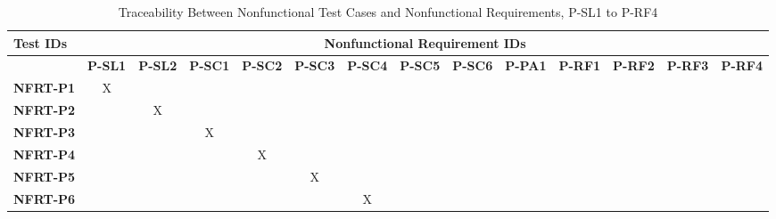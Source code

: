 \documentclass[12pt, titlepage]{article}
\begin{document}
\begin{landscape}
		\begin{longtable}{|l|ccccccccccccc|}
	\caption{Traceability Between Nonfunctional Test Cases and Nonfunctional Requirements, P-SL1 to P-RF4}                                                                                                                                                                                                                           \\
		\hline
		\textbf{Test IDs}   & \multicolumn{13}{c|}{\textbf{Nonfunctional Requirement IDs}}                                                                                                                                                                                                                 \\
		\hline
		~                   & \textbf{P-SL1}  & \textbf{P-SL2} & \textbf{P-SC1} & \textbf{P-SC2} & \textbf{P-SC3} & \textbf{P-SC4} & \textbf{P-SC5} & \textbf{P-SC6} & \textbf{P-PA1} & \textbf{P-RF1} & \textbf{P-RF2} & \textbf{P-RF3} & \textbf{P-RF4} \\
		\hline
		\textbf{NFRT-P1} & X                                                         & ~             & ~             & ~             & ~             & ~             & ~             & ~             & ~             & ~             & ~             & ~             & ~\\
		\textbf{NFRT-P2} & ~                                                         & X             & ~             & ~             & ~             & ~             & ~             & ~             & ~             & ~             & ~             & ~             & ~ \\
		\textbf{NFRT-P3} & ~                                                         & ~             & X             & ~             & ~             & ~             & ~             & ~             & ~             & ~             & ~ & ~ & ~ \\
		\textbf{NFRT-P4} & ~                                                         & ~             & ~             & X             & ~             & ~             & ~             & ~             & ~             & ~             & ~ & ~ & ~ \\
		\textbf{NFRT-P5} & ~                                                         & ~             & ~             & ~             & X             & ~             & ~             & ~             & ~             & ~             & ~ & ~ & ~ \\
		\textbf{NFRT-P6} & ~                                                         & ~             & ~             & ~             & ~             & X             & ~             & ~             & ~             & ~             & ~ & ~ & ~ \\

\end{longtable}
\end{landscape}
\end{document}
